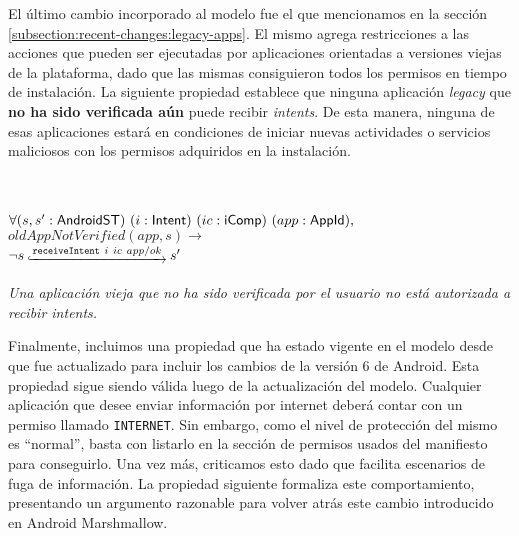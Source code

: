 El último cambio incorporado al modelo fue el que mencionamos en la sección
\ref{subsection:recent-changes:legacy-apps}. El mismo agrega restricciones a las acciones que pueden
ser ejecutadas por aplicaciones orientadas a versiones viejas de la plataforma, dado que las mismas
consiguieron todos los permisos en tiempo de instalación. La siguiente propiedad establece que
ninguna aplicación \textit{legacy} que \textbf{no ha sido verificada aún} puede recibir
\textit{intents}. De esta manera, ninguna de esas aplicaciones estará en condiciones de iniciar
nuevas actividades o servicios maliciosos con los permisos adquiridos en la instalación.

\begin{prop} \label{section:formalization:property5} \mbox{} \\ \\
    $\forall (s,s': \mathsf{AndroidST})~(i:\mathsf{Intent})~(ic:\mathsf{iComp})~(app:\mathsf{AppId}),$ \\
    $oldAppNotVerified(app, s) \rightarrow$ \\
    $\neg \Mathexecrel{s}{\texttt{receiveIntent}~i~ic~app/ok}{s'}$ \\ \\

    \textit{Una aplicación vieja que no ha sido verificada por el usuario no está autorizada a recibir intents.}
\end{prop}


Finalmente, incluimos una propiedad que ha estado vigente en el modelo desde que fue actualizado
para incluir los cambios de la versión 6 de Android. Esta propiedad sigue siendo válida luego de la
actualización del modelo. Cualquier aplicación que desee enviar información por internet deberá
contar con un permiso llamado \texttt{INTERNET}. Sin embargo, como el nivel de protección del mismo
es ``normal'', basta con listarlo en la sección de permisos usados del manifiesto para conseguirlo.
Una vez más, criticamos esto dado que facilita escenarios de fuga de información. La propiedad
siguiente formaliza este comportamiento, presentando un argumento razonable para volver atrás este
cambio introducido en Android Marshmallow.


